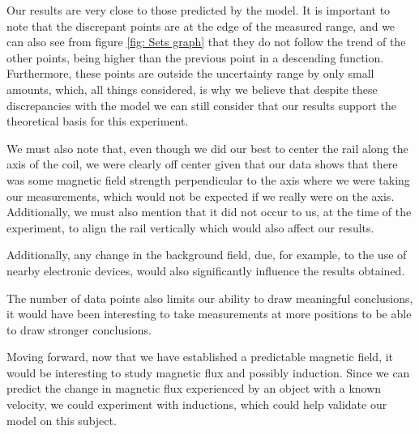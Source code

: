 Our results are very close to those predicted by the model. It is important to note that the discrepant points are at the edge of the measured range, and we can also see from figure \ref{fig: Sets graph} that they do not follow the trend of the other points, being higher than the previous point in a descending function. Furthermore, these points are outside the uncertainty range by only small amounts, which, all things considered, is why we believe that despite these discrepancies with the model we can still consider that our results support the theoretical basis for this experiment.

We must also note that, even though we did our best to center the rail along the axis of the coil, we were clearly off center given that our data shows that there was some magnetic field strength perpendicular to the axis where we were taking our measurements, which would not be expected if we really were on the axis. Additionally, we must also mention that it did not occur to us, at the time of the experiment, to align the rail vertically which would also affect our results.

Additionally, any change in the background field, due, for example, to the use of nearby electronic devices, would also significantly influence the results obtained.

The number of data points also limits our ability to draw meaningful conclusions, it would have been interesting to take measurements at more positions to be able to draw stronger conclusions.

Moving forward, now that we have established a predictable magnetic field, it would be interesting to study magnetic flux and possibly induction. Since we can predict the change in magnetic flux experienced by an object with a known velocity, we could experiment with inductions, which could help validate our model on this subject.